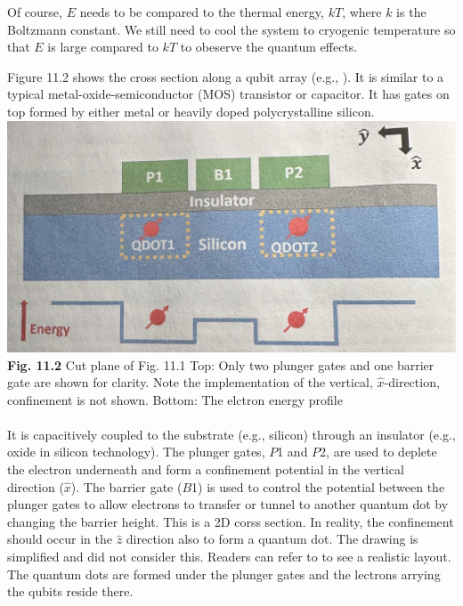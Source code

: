 \documentclass{article}
\begin{document}
Of course, $E$ needs to be compared to the thermal energy, $kT$, where $k$ is the Boltzmann
constant. We still need to cool the system to cryogenic temperature so that $E$ is large
compared to $kT$ to obeserve the quantum effects.

Figure 11.2 shows the cross section along a qubit array (e.g., \cite{4veldhorst2014addressable}). It is similar to a typical
metal-oxide-semiconductor (MOS) transistor or capacitor. It has gates on top formed by either metal or heavily doped polycrystalline silicon.\\

\includegraphics[scale=0.45]{Fig.11.2.jpeg}\\
\textbf{Fig. 11.2} Cut plane of Fig. 11.1 Top: Only two plunger gates and one barrier gate are shown for clarity.
Note the implementation of the vertical, $\hat{x}$-direction, confinement is not shown. Bottom: The elctron energy profile\\\\
It is capacitively coupled to the substrate (e.g., silicon) through an insulator (e.g., oxide in silicon technology).
The plunger gates, $P$1 and $P$2, are used to deplete the electron underneath and form a 
confinement potential in the vertical direction ($\hat{x}$). The barrier gate ($B$1) is used to control the potential between the plunger gates
to allow electrons to transfer or tunnel to another quantum dot by changing the barrier height.
This is a 2D corss section. In reality, the confinement should occur in the $\hat{z}$ direction also to form a quantum dot.
The drawing is simplified and did not consider this. Readers can refer to \cite{4veldhorst2014addressable} to see a realistic layout. The quantum dots are formed under the plunger
gates and the lectrons arrying the qubits reside there.
\end{document}
